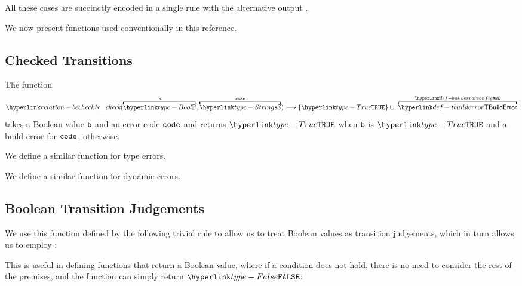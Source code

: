 All these cases are succinctly encoded in a single rule with the alternative output \configurationsterm{}.

We now present functions used conventionally in this reference.

\subsection{Checked Transitions\label{sec:Checked Transitions}}
\hypertarget{relation-becheck}{}
\hypertarget{type-builderror}{}
The function
\[
\becheck(\overname{\Bool}{\vb}, \overname{\Strings}{\vcode}) \aslto \{\True\}
\cup\ \overname{\TBuildError}{\BuildErrorConfig}
\]
takes a Boolean value $\texttt{b}$ and an error code $\texttt{code}$
and returns $\True$ when $\texttt{b}$ is $\True$ and a build error \configurationterm{} for $\texttt{code}$, otherwise.

We define a similar function for type errors.

We define a similar function for dynamic errors.

\subsection{Boolean Transition Judgements}
We use this function defined by the following trivial rule to allow us to treat Boolean values as transition judgements,
which in turn allows us to employ \shortcircuitrulemacros{}:

This is useful in defining functions that return a Boolean value, where if a condition does not hold,
there is no need to consider the rest of the premises, and the function can simply return $\False$:
\begin{mathpar}
\end{mathpar}

